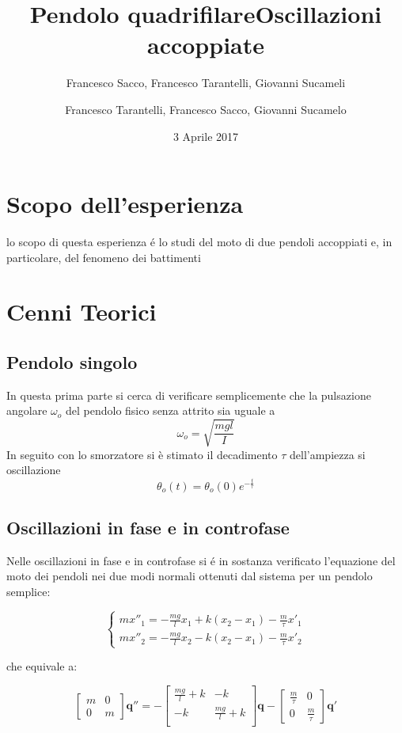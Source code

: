 \documentclass{exam}
\date{3 Aprile 2017}
\title{Pendolo quadrifilare}
\author{Francesco Sacco, Francesco Tarantelli, Giovanni Sucameli}
\author{Francesco Tarantelli, Francesco Sacco, Giovanni Sucamelo}
\title{Oscillazioni accoppiate}
\begin{document}
	\maketitle
	\section{Scopo dell'esperienza}
		lo scopo di questa esperienza \'e lo studi del moto di due pendoli accoppiati e, in particolare, del fenomeno dei battimenti


	\section{Cenni Teorici}
		\subsection{Pendolo singolo}
			In questa prima parte si cerca di verificare semplicemente che la pulsazione angolare $\omega_o$ del pendolo fisico senza attrito sia uguale a 
			\begin{equation}
				\omega_o=\sqrt{\frac{mgl}{I}}
			\end{equation}
			In seguito con lo smorzatore si è stimato il decadimento $\tau $ dell'ampiezza si oscillazione
			\begin{equation}
				\theta_o(t)=\theta_o(0)e^{-\frac{t}{\tau}}
			\end{equation}
	\subsection{Oscillazioni in fase e in controfase}
		Nelle oscillazioni in fase e in controfase si \'e in sostanza verificato l'equazione del moto dei pendoli nei due modi normali ottenuti dal sistema per un pendolo semplice:

		\begin{equation}
			\begin{cases} 
				m x''_1=-\frac{mg}{l}x_1 + k(x_2-x_1) -\frac{m}{\tau} x'_1 \\
				m x''_2=-\frac{mg}{l}x_2 -  k(x_2-x_1) - \frac{m}{\tau} x'_2
			\end{cases}
		\end{equation}

		che equivale a:

		\begin{equation}
			\begin{bmatrix}
				m & 0 \\
				0 & m
			\end{bmatrix}
			\mathbf{q''}=-
			\begin{bmatrix}
				\frac{mg}{l} + k & -k \\
				-k & \frac{mg}{l} + k \\
			\end{bmatrix}
			\mathbf{q} -
			\begin{bmatrix}
				\frac{m}{\tau} & 0 \\
				0 & \frac{m}{\tau} 
			\end{bmatrix}
			\mathbf{q'} 
		\end{equation}
\end{document}
